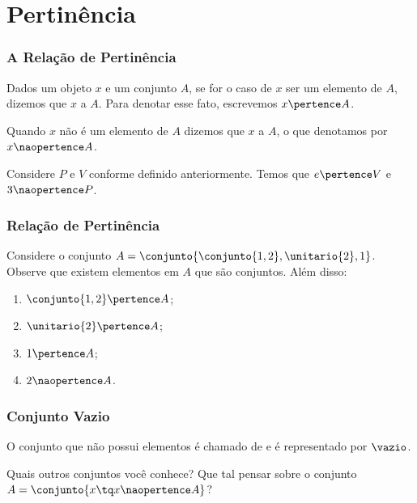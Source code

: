 \section{Pertinência}


\begin{frame}
    \frametitle{A Relação de Pertinência}
    
    \begin{definicao}
        \label{def:pertinencia}
    Dados um objeto $x$ e um conjunto $A$, se for o caso de $x$ ser um elemento de $A$, dizemos que $x$  a $A$. Para denotar esse fato, escrevemos $x \pertence A$.

    \label{def:naopertinencia}
    Quando $x$ não é um elemento de $A$ dizemos que $x$  a $A$, o que denotamos por $x \naopertence A$.
    \end{definicao}\pause

	
    \begin{exemplo}
        Considere $P$ e $V$ conforme definido anteriormente. Temos que $e \pertence V$ e $3 \naopertence P$.
    \end{exemplo}
\end{frame}


\begin{frame}
    \frametitle{Relação de Pertinência}
    
    \begin{exemplo}
        Considere o conjunto $A = \conjunto{\conjunto{1, 2}, \unitario{2}, 1 }$. Observe que existem elementos em $A$ que são conjuntos. Além disso:
        \begin{enumerate}
            \item $\conjunto{1, 2} \pertence A$;
            \item $\unitario{2} \pertence A$;
            \item $1 \pertence A$;
            \item $2 \naopertence A$.
        \end{enumerate}
    \end{exemplo}
\end{frame}


\begin{frame}
    \frametitle{Conjunto Vazio}

    \begin{definicao}
        O conjunto que não possui elementos é chamado de  e é representado por $\vazio$.
    \end{definicao}\pause

    \begin{exemplo}
        Quais outros conjuntos você conhece? Que tal pensar sobre o conjunto $ A = \conjunto{ x \tq x \naopertence A} $?
    \end{exemplo}
\end{frame}